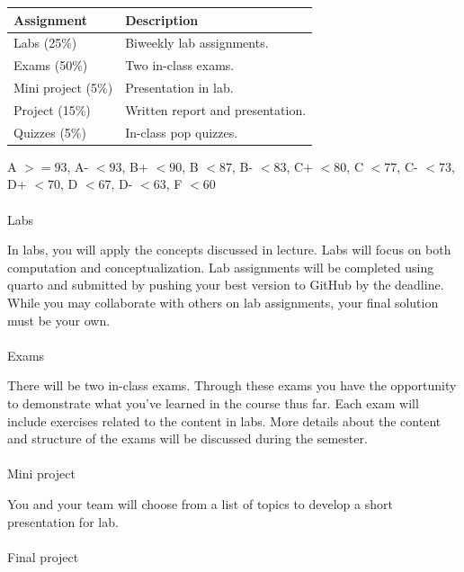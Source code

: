 \documentclass[
  12pt,
  letterpaper,
  DIV=11,
  numbers=noendperiod]{scrartcl}
\makeatletter
\let\oldparagraph\paragraph
\renewcommand{\paragraph}{
    \@ifstar
      \xxxParagraphStar
      \xxxParagraphNoStar
  }
\newcommand{\xxxParagraphStar}[1]{\oldparagraph*{#1}\mbox{}}
\newcommand{\xxxParagraphNoStar}[1]{\oldparagraph{#1}\mbox{}}
\makeatother
\begin{document}
\begin{longtable}[]{@{}ll@{}}
\toprule\noalign{}
Assignment & Description \\
\midrule\noalign{}
\endhead
\bottomrule\noalign{}
\endlastfoot
Labs (25\%) & Biweekly lab assignments. \\
Exams (50\%) & Two in-class exams. \\
Mini project (5\%) & Presentation in lab. \\
Project (15\%) & Written report and presentation. \\
Quizzes (5\%) & In-class pop quizzes. \\
\end{longtable}

A \(>= 93\), A- \(< 93\), B+ \(< 90\), B \(< 87\), B- \(< 83\), C+
\(<80\), C \(< 77\), C- \(< 73\), D+ \(< 70\), D \(< 67\), D- \(< 63\),
F \(< 60\)

\paragraph{Labs}\label{labs}

In labs, you will apply the concepts discussed in lecture. Labs will
focus on both computation and conceptualization. Lab assignments will be
completed using quarto and submitted by pushing your best version to
GitHub by the deadline. While you may collaborate with others on lab
assignments, your final solution must be your own.

\paragraph{Exams}\label{exams}

There will be two in-class exams. Through these exams you have the
opportunity to demonstrate what you've learned in the course thus far.
Each exam will include exercises related to the content in labs. More
details about the content and structure of the exams will be discussed
during the semester.

\paragraph{Mini project}\label{mini-project}

You and your team will choose from a list of topics to develop a short
presentation for lab.

\paragraph{Final project}\label{final-project}
\end{document}
